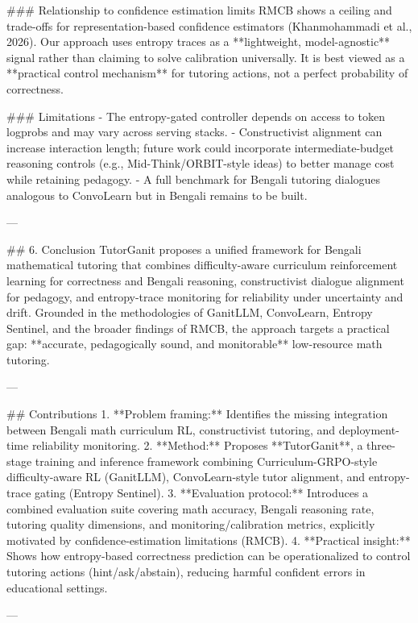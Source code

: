 ### Relationship to confidence estimation limits  
RMCB shows a ceiling and trade-offs for representation-based confidence estimators (Khanmohammadi et al., 2026). Our approach uses entropy traces as a **lightweight, model-agnostic** signal rather than claiming to solve calibration universally. It is best viewed as a **practical control mechanism** for tutoring actions, not a perfect probability of correctness.

### Limitations  
- The entropy-gated controller depends on access to token logprobs and may vary across serving stacks.  
- Constructivist alignment can increase interaction length; future work could incorporate intermediate-budget reasoning controls (e.g., Mid-Think/ORBIT-style ideas) to better manage cost while retaining pedagogy.  
- A full benchmark for Bengali tutoring dialogues analogous to ConvoLearn but in Bengali remains to be built.

---

## 6. Conclusion  
TutorGanit proposes a unified framework for Bengali mathematical tutoring that combines difficulty-aware curriculum reinforcement learning for correctness and Bengali reasoning, constructivist dialogue alignment for pedagogy, and entropy-trace monitoring for reliability under uncertainty and drift. Grounded in the methodologies of GanitLLM, ConvoLearn, Entropy Sentinel, and the broader findings of RMCB, the approach targets a practical gap: **accurate, pedagogically sound, and monitorable** low-resource math tutoring.

---

## Contributions  
1. **Problem framing:** Identifies the missing integration between Bengali math curriculum RL, constructivist tutoring, and deployment-time reliability monitoring.  
2. **Method:** Proposes **TutorGanit**, a three-stage training and inference framework combining Curriculum-GRPO-style difficulty-aware RL (GanitLLM), ConvoLearn-style tutor alignment, and entropy-trace gating (Entropy Sentinel).  
3. **Evaluation protocol:** Introduces a combined evaluation suite covering math accuracy, Bengali reasoning rate, tutoring quality dimensions, and monitoring/calibration metrics, explicitly motivated by confidence-estimation limitations (RMCB).  
4. **Practical insight:** Shows how entropy-based correctness prediction can be operationalized to control tutoring actions (hint/ask/abstain), reducing harmful confident errors in educational settings.

---
